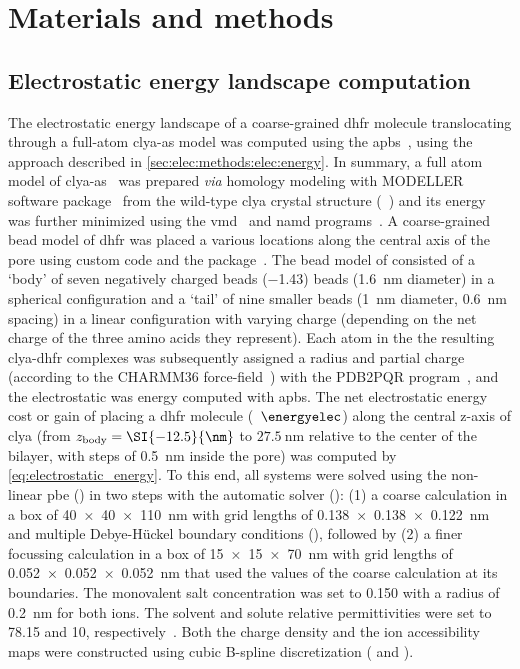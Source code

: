 %
\section{Materials and methods}
%
\label{sec:trapping:methods}
%

\subsection{Electrostatic energy landscape computation}
%
The electrostatic energy landscape of a coarse-grained \gls{dhfr} molecule translocating through a full-atom
\gls{clya-as} model was computed using the \gls{apbs}~\cite{Baker-2001}, using the approach described in
\cref{sec:elec:methods:elec:energy}. In summary, a full atom model of \gls{clya-as}~\cite{Franceschini-2016}
was prepared \textit{via} homology modeling with MODELLER software package~\cite{Sali-1993} from the wild-type
\gls{clya} crystal structure (~\cite{Mueller-2009}) and its energy was further minimized using the
\gls{vmd}~\cite{Humphrey-1996} and \gls{namd} programs~\cite{Phillips-2005}. A coarse-grained bead model of
\gls{dhfr} was placed a various locations along the central axis of the pore using custom  code
and the  package~\cite{Cock-2009}. The bead model of \DHFRt{} consisted of a `body' of seven
negatively charged beads  (\SI{-1.43}{\ec}) beads (\SI{1.6}{\nm} diameter) in a spherical configuration and a
`tail' of nine smaller beads (\SI{1}{\nm} diameter, \SI{0.6}{\nm} spacing) in a linear configuration with
varying charge (depending on the net charge of the three amino acids they represent). Each atom in the the
resulting \gls{clya}-\gls{dhfr} complexes was subsequently assigned a radius and partial charge (according to
the CHARMM36 force-field~\cite{Huang-2013}) with the PDB2PQR program~\cite{Dolinsky-2004,Dolinsky-2007}, and
the electrostatic was energy computed with \gls{apbs}. The net electrostatic energy cost or gain of placing a
\gls{dhfr} molecule (\ie~$\energyelec$) along the central z-axis of \gls{clya} (from
$z_{\rm{body}}=\SI{-12.5}{\nm}$ to $\SI{27.5}{\nm}$ relative to the center of the bilayer, with steps of
\SI{0.5}{\nm} inside the pore) was computed by \cref{eq:electrostatic_energy}. To this end, all systems were
solved using the non-linear \gls{pbe} () in two steps with the automatic solver ():
(1) a coarse calculation in a box of \SI{40x40x110}{\nm} with grid lengths of \SI{0.138x0.138x0.122}{\nm} and
multiple Debye-H\"{u}ckel boundary conditions (), followed by (2) a finer focussing calculation
in a box of \SI{15x15x70}{\nm} with grid lengths of \SI{0.052x0.052x0.052}{\nm} that used the values of the
coarse calculation at its boundaries. The monovalent salt concentration was set to \SI{0.150}{\Molar} with a
radius of \SI{0.2}{\nm} for both ions. The solvent and solute relative permittivities were set to \num{78.15}
and \num{10}, respectively~\cite{Li-2013}. Both the charge density and the ion accessibility maps were
constructed using cubic B-spline discretization ( and ).


